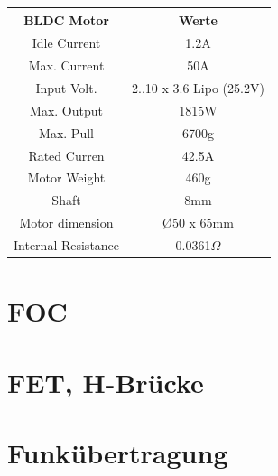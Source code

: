 \begin{center}
	\begin{tabular}{|c|c|}
		\hline 
		\rule[-1ex]{0pt}{2.5ex}  BLDC Motor & Werte  \\ 
		\hline 
		\rule[-1ex]{0pt}{2.5ex} Idle Current & 1.2A \\ 
		\hline 
		\rule[-1ex]{0pt}{2.5ex} Max. Current & 50A \\ 
		\hline
		\rule[-1ex]{0pt}{2.5ex} Input Volt. & 2..10 x 3.6 Lipo (25.2V) \\ 
		\hline
		\rule[-1ex]{0pt}{2.5ex} Max. Output & 1815W \\ 
		\hline
		\rule[-1ex]{0pt}{2.5ex} Max. Pull & 6700g \\ 
		\hline
		\rule[-1ex]{0pt}{2.5ex} Rated Curren & 42.5A \\ 
		\hline
		\rule[-1ex]{0pt}{2.5ex} Motor Weight & 460g \\ 
		\hline
		\rule[-1ex]{0pt}{2.5ex} Shaft & 8mm \\ 
		\hline
		\rule[-1ex]{0pt}{2.5ex} Motor dimension & \O 50 x 65mm \\ 
		\hline
		\rule[-1ex]{0pt}{2.5ex} Internal Resistance & 0.0361$\Omega$ \\ 
		\hline	
	\end{tabular} 
	\label{tabBLDCdaten}
\end{center}






\section{FOC}
\label{tGl_FOC}
\section{FET, H-Brücke}
\label{tGl_HBrugg}
\section{Funkübertragung}
\label{tGl_RF}
